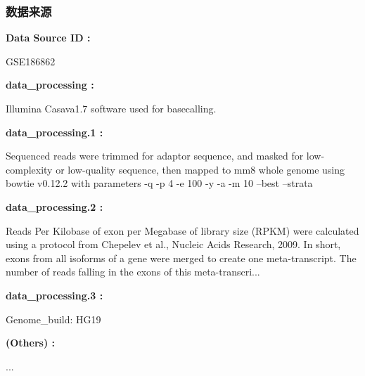 \documentclass[
]{article}
\begin{document}
\hypertarget{ux6570ux636eux6765ux6e90}{%
\subsubsection{数据来源}\label{ux6570ux636eux6765ux6e90}}

\begin{center}\begin{tcolorbox}[colback=gray!10, colframe=gray!50, width=0.9\linewidth, arc=1mm, boxrule=0.5pt]
\textbf{
Data Source ID
:}

\vspace{0.5em}

    GSE186862

\vspace{2em}


\textbf{
data\_processing
:}

\vspace{0.5em}

    Illumina Casava1.7 software used for basecalling.

\vspace{2em}


\textbf{
data\_processing.1
:}

\vspace{0.5em}

    Sequenced reads were trimmed for adaptor sequence, and
masked for low-complexity or low-quality sequence, then
mapped to mm8 whole genome using bowtie v0.12.2 with
parameters -q -p 4 -e 100 -y -a -m 10 --best --strata

\vspace{2em}


\textbf{
data\_processing.2
:}

\vspace{0.5em}

    Reads Per Kilobase of exon per Megabase of library size
(RPKM) were calculated using a protocol from Chepelev et
al., Nucleic Acids Research, 2009. In short, exons from all
isoforms of a gene were merged to create one
meta-transcript. The number of reads falling in the exons
of this meta-transcri...

\vspace{2em}


\textbf{
data\_processing.3
:}

\vspace{0.5em}

    Genome\_build: HG19

\vspace{2em}


\textbf{
(Others)
:}

\vspace{0.5em}

    ...

\vspace{2em}
\end{tcolorbox}
\end{center}
\end{document}
